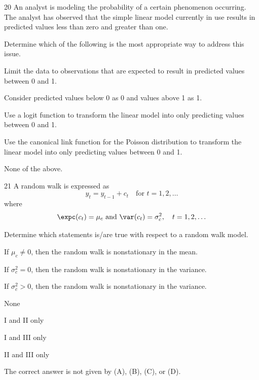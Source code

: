 \begin{question}{20}
An analyst is modeling the probability of a certain phenomenon occurring. The analyst has observed that the simple linear model currently in use results in predicted values less than zero and greater than one.

Determine which of the following is the most appropriate way to address this issue.

\begin{choices}
\item Limit the data to observations that are expected to result in predicted values between 0 and 1.
\item Consider predicted values below 0 as 0 and values above 1 as 1.
\item Use a logit function to transform the linear model into only predicting values between 0 and 1.
\item Use the canonical link function for the Poisson distribution to transform the linear model into only predicting values between 0 and 1.
\item None of the above.
\end{choices}
\end{question}

\begin{question}{21}
A random walk is expressed as
\[ y_t = y_{t-1} + c_t \quad \text{for } t = 1, 2, \ldots \]
where
\[ \expc(c_t) = \mu_c \text{ and } \var(c_t) = \sigma_c^2, \quad t = 1, 2, \ldots \]

Determine which statements is/are true with respect to a random walk model.
\begin{statements}
\item If $\mu_c \neq 0$, then the random walk is nonstationary in the mean.
\item If $\sigma_c^2 = 0$, then the random walk is nonstationary in the variance.
\item If $\sigma_c^2 > 0$, then the random walk is nonstationary in the variance.
\end{statements}

\begin{choices}
\item None
\item I and II only
\item I and III only
\item II and III only
\item The correct answer is not given by (A), (B), (C), or (D).
\end{choices}
\end{question}

